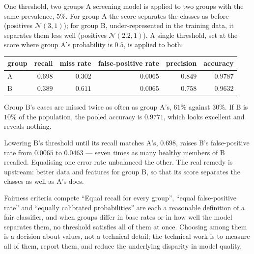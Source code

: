 \begin{workedexample}{One threshold, two groups}
A screening model is applied to two groups with the same prevalence, $5\%$. For
group A the score separates the classes as before (positives $\mathcal{N}(3,1)$);
for group B, under-represented in the training data, it separates them less well
(positives $\mathcal{N}(2.2,1)$). A single threshold, set at the score where
group A's probability is $0.5$, is applied to both:

\begin{center}
\small
\renewcommand{\arraystretch}{1.15}
\begin{tabular}{@{}lrrrrr@{}}
\toprule
group & recall & miss rate & false-positive rate & precision & accuracy\\
\midrule
A & $0.698$ & $0.302$ & $0.0065$ & $0.849$ & $0.9787$\\
B & $0.389$ & $0.611$ & $0.0065$ & $0.758$ & $0.9632$\\
\bottomrule
\end{tabular}
\end{center}

Group B's cases are missed twice as often as group A's, $61\%$ against $30\%$.
If B is $10\%$ of the population, the pooled accuracy is $0.9771$, which looks
excellent and reveals nothing.

Lowering B's threshold until its recall matches A's, $0.698$, raises B's
false-positive rate from $0.0065$ to $0.0463$ --- seven times as many healthy
members of B recalled. Equalising one error rate unbalanced the other. The real
remedy is upstream: better data and features for group B, so that its score
separates the classes as well as A's does.
\end{workedexample}

\begin{keyinsight}{Fairness criteria compete}
``Equal recall for every group'', ``equal false-positive rate'' and ``equally
calibrated probabilities'' are each a reasonable definition of a fair
classifier, and when groups differ in base rates or in how well the model
separates them, no threshold satisfies all of them at once. Choosing among them
is a decision about values, not a technical detail; the technical work is to
measure all of them, report them, and reduce the underlying disparity in model
quality.
\end{keyinsight}

